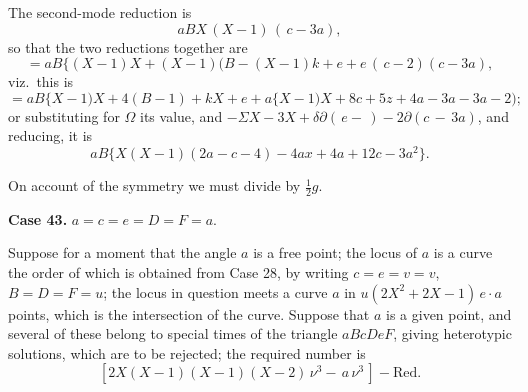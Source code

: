 \documentclass[11pt,a4paper]{article}
\theoremstyle{plain}
\theoremstyle{definition}
\begin{document}
The second-mode reduction is
\[
aBX\,(X-1)\,(\,c-3a),
\]
so that the two reductions together are
\[
=aB\{(X-1)X+(X-1)(B-(X-1)k+e+e\,(\,c-2)(c-3a),
\]
viz.\ this is
\[
=aB\{X-1)X+4(B-1)+kX+e+a\{X-1)X+8c+5z+4a-3a-3a-2);
\]
or substituting for $\Omega$ its value, and $-\Sigma X-3X+\delta\partial(\,e-\,)-2\partial(c\,-\,3a)$, and
reducing, it is
\[
aB\{X(X-1)(2a-c-4)-4ax+4a+12c-3a^2\}.
\]

On account of the symmetry we must divide by $\frac{1}{2}g$.

\textbf{Case 43.}  $a=c=e=D=F=a$.

Suppose for a moment that the angle $a$ is a free point; the locus of $a$ is a curve
the order of which is obtained from Case 28, by writing $c=e=v=v$, $B=D=F=u$;  the
locus in question meets a curve $a$ in $u (2X^2 + 2X - 1)\,e\cdot a$ points, which is the
intersection of the curve.  Suppose that $a$ is a given point, and several of these belong to
special times of the triangle $aBcDeF$, giving heterotypic solutions, which are to be
rejected; the required number is
\[
[2X(X-1)(X-1)(X-2)\,\nu^3-\,a\,\nu^3\,]-\text{Red.}
\]

\clearpage
\end{document}
